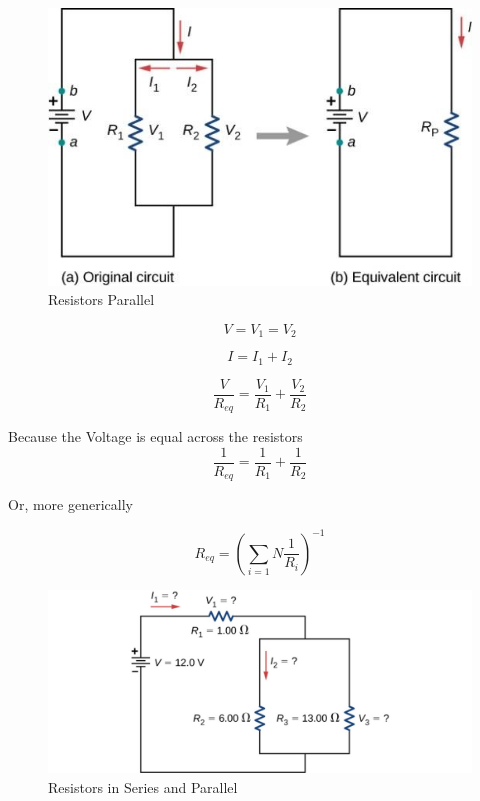 \documentclass[14pt]{memoir}
\begin{document}
\begin{figure}[H]
\begin{center}
\includegraphics[scale=0.50]{fig/fig_10_14.jpg}
\caption{Resistors Parallel}
\label{fig:10_14}
\end{center}
\end{figure}

\begin{equation}
V = V_1 = V_2
\end{equation}

\begin{equation}
I = I_1 + I_2
\end{equation}

\begin{equation}
\frac{V}{R_{eq}} = \frac{V_1}{R_1} + \frac{V_2}{R_2}
\end{equation}

Because the Voltage is equal across the resistors
\begin{equation}
\frac{1}{R_{eq}} = \frac{1}{R_1} + \frac{1}{R_2}
\end{equation}

Or, more generically

\begin{equation}
R_{eq} = (\sum_{i=1}{N} \frac{1}{R_i})^{-1}
\end{equation}



\begin{figure}[H]
\begin{center}
\includegraphics[scale=0.50]{fig/fig_10_16.jpg}
\caption{Resistors in Series and Parallel}
\label{fig:10_16}
\end{center}
\end{figure}
\end{document}
